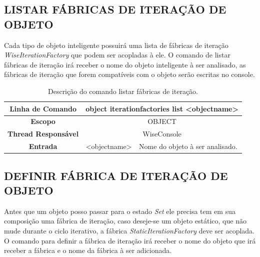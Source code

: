 \subsection{LISTAR FÁBRICAS DE ITERAÇÃO DE OBJETO}\label{sec:iteration_factories_list}

Cada tipo de objeto inteligente possuirá uma lista de fábricas de iteração \textit{WiseIterationFactory} que podem ser acopladas à ele. O comando de listar fábricas de iteração irá receber o nome do objeto inteligente à ser analisado, as fábricas de iteração que forem compatíveis com o objeto serão escritas no console.

\begin{center}
	\begin{table}[!htbp]
		\begin{tabular}{|c|c|m{}|}
			\hline
			\textbf{Linha de Comando} & \multicolumn{2}{c|}{object iteration\underline{\space\space}factories list <object\underline{\space\space}name>} \\
			\hline
			\textbf{Escopo} & \multicolumn{2}{c|}{OBJECT} \\
			\hline
			\textbf{Thread Responsável} & \multicolumn{2}{c|}{WiseConsole} \\
			\hline
			\textbf{Entrada} & <object\underline{\space\space}name> & Nome do objeto à ser analisado. \\
			\hline
		\end{tabular}
		\caption{Descrição do comando listar fábricas de iteração.}
		\label{tab:iteration_factories_list}
	\end{table}
\end{center}

\subsection{DEFINIR FÁBRICA DE ITERAÇÃO DE OBJETO}\label{sec:iteration_factories_set}

Antes que um objeto posso passar para o estado \textit{Set} ele precisa tem em sua composição uma fábrica de iteração, caso deseje-se um objeto estático, que não mude durante o ciclo iterativo, a fábrica \textit{StaticIterationFactory} deve ser acoplada. O comando para definir a fábrica de iteração irá receber o nome do objeto que irá receber a fábrica e o nome da fábrica à ser adicionada.

